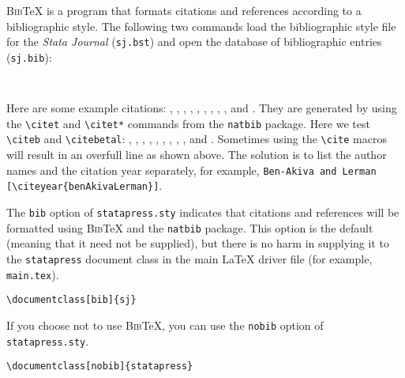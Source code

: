 \textsc{Bib}{\TeX} is a program that formats citations and references
according to a bibliographic style.  The following two commands load the
bibliographic style file for the {\sl Stata Journal\/} (\texttt{sj.bst}) and
open the database of bibliographic entries (\texttt{sj.bib}):

\begin{stverbatim}
\begin{verbatim}


\end{verbatim}
\end{stverbatim}

Here are some example citations:
%
\citet{akaike}, \citet*{benAkivaLerman}, \citet{dykePatterson},
\citet{greene03},
\citet*{kendallstuart}, \citet{hilbe93a}, \citet{hilbe94}, \citet{hilbe93b},
\citet{maddala83}, and \citet*{latexcompanion}.
%
They are generated by using
the \verb+\citet+ and \verb+\citet*+ commands from the \texttt{natbib}
package.  Here we test \verb+\citeb+ and \verb+\citebetal+:
%
, , ,
, , , ,
, , and .
Sometimes using the \verb+\cite+ macros will result in an overfull line as
shown above.  The solution is to list the author names and the citation year
separately, for example,
\verb+Ben-Akiva and Lerman [\citeyear{benAkivaLerman}]+.

\clearpage
The \texttt{bib} option of \texttt{statapress.sty} indicates that citations
and references will be formatted using \textsc{Bib}{\TeX} and the
\texttt{natbib} package.  This option is the default (meaning that it need not
be supplied), but there is no harm in supplying it to the \texttt{statapress}
document class in the main {\LaTeX} driver file (for example,
\texttt{main.tex}).

\begin{stverbatim}
\begin{verbatim}
\documentclass[bib]{sj}
\end{verbatim}
\end{stverbatim}

\noindent
If you choose not to use \textsc{Bib}{\TeX}, you can use the \texttt{nobib}
option of \texttt{statapress.sty}.

\begin{stverbatim}
\begin{verbatim}
\documentclass[nobib]{statapress}
\end{verbatim}
\end{stverbatim}

